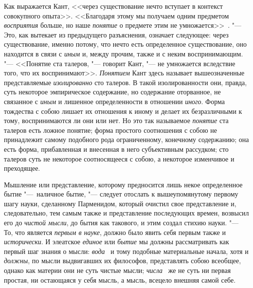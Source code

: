 Как выражается Кант, <<через существование нечто вступает в контекст
совокупного опыта>>. <<Благодаря этому мы получаем одним предметом
{\em восприятия} больше, но наше
{\em понятие} о предмете этим не
умножается>>~. "--- Это, как вытекает из предыдущего
разъяснения, означает следующее: через существование, именно потому, что
нечто есть определенное существование, оно находится в связи с
{\em иным} и, между прочим, также и с неким
воспринимающим. "--- <<Понятие ста талеров, "--- говорит Кант, "--- не умножается
вследствие того, что их воспринимают>>. {\em Понятием}
Кант здесь называет вышеозначенные представляемые
{\em изолированно} сто талеров. В такой изолированности
они, правда, суть некоторое эмпирическое содержание, но содержание
оторванное, не связанное с {\em иным} и лишенное
определенности в отношении {\em иного}. Форма
тождества с собою лишает их отношения к иному и делает их безразличными к
тому, воспринимаются ли они или нет. Но это так называемое
{\em понятие} ста талеров есть ложное понятие; форма
простого соотношения с собою не принадлежит самому подобного рода
ограниченному, конечному содержанию; она есть форма, прибавленная и
внесенная в него субъективным рассудком; сто талеров суть не некоторое
соотносящееся с собою, а некоторое изменчивое и преходящее.

Мышление или представление, которому предносится лишь некое определенное
бытие "---~наличное бытие, "--- следует отослать к вышеупомянутому первому шагу
науки, сделанному Парменидом, который очистил свое представление и,
следовательно, тем самым также и представление последующих времен, возвысил
его до {\em чистой мысли}, до бытия как такового, и
этим создал стихию науки. "--- То, что является
{\em первым в науке}, должно было явить себя первым
также и {\em исторически}. И элеатское
{\em единое} или {\em бытие} мы
должны рассматривать как первый шаг знания о мысли:
{\em вода}~ и тому
подобные материальные начала, хотя и {\em должны}, по
мысли выдвигавших их философов, представлять собою всеобщее, однако как
материи они не суть чистые мысли;
{\em числа}~ же не суть ни первая
простая, ни остающаяся у себя мысль, а мысль, всецело внешняя самой себе.

